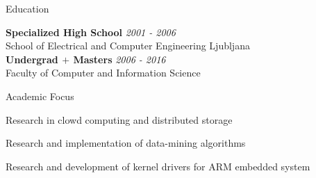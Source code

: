 \documentclass{resume} %
\begin{document}

\begin{rSection}{Education}

{\bf Specialized High School} \hfill {\em 2001 - 2006} \\ 
School of Electrical and Computer Engineering Ljubljana\\

{\bf Undergrad $+$ Masters} \hfill {\em 2006 - 2016} \\ 
Faculty of Computer and Information Science \\


\begin{aSubsection}{Academic Focus}
\item Research in clowd computing and distributed storage
\item Research and implementation of data-mining algorithms
\item Research and development of kernel drivers for ARM embedded system
\end{aSubsection}


\end{rSection}

\end{document}
